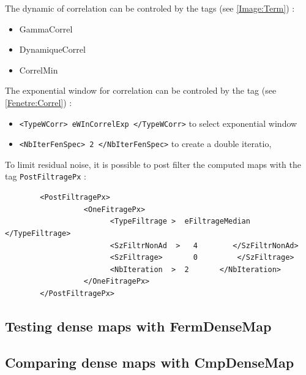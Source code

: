 
The dynamic of correlation can be controled by the tags (see \ref{Image:Term}) :

\begin{itemize}
    \item  GammaCorrel
    \item  DynamiqueCorrel
    \item  CorrelMin
\end{itemize}

The exponential window for correlation can be controled by the tag (see \ref{Fenetre:Correl}) :

\begin{itemize}
    \item  {\tt    <TypeWCorr> eWInCorrelExp            </TypeWCorr>} to select exponential window
    \item  {\tt    <NbIterFenSpec>   2           </NbIterFenSpec>}  to create a double iteratio,
\end{itemize}

To limit residual noise, it is possible to  post filter the computed  maps with the
tag {\tt PostFiltragePx} :

\begin{verbatim}
        <PostFiltragePx>
                  <OneFitragePx>
                        <TypeFiltrage >  eFiltrageMedian  </TypeFiltrage>
                        <SzFiltrNonAd  >   4        </SzFiltrNonAd>
                        <SzFiltrage>       0         </SzFiltrage>
                        <NbIteration  >  2       </NbIteration>
                  </OneFitragePx>
        </PostFiltragePx>
\end{verbatim}


\subsection{Testing dense maps with FermDenseMap}


\subsection{Comparing dense maps with CmpDenseMap}


